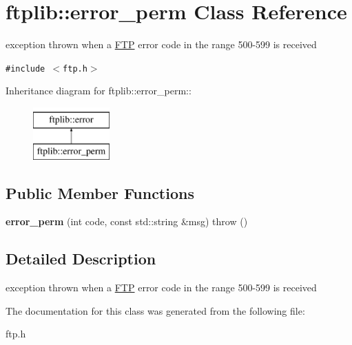 \hypertarget{classftplib_1_1error__perm}{
\section{ftplib::error\_\-perm Class Reference}
\label{classftplib_1_1error__perm}
}
exception thrown when a \hyperlink{classftplib_1_1FTP}{FTP} error code in the range 500-599 is received  


{\tt \#include $<$ftp.h$>$}

Inheritance diagram for ftplib::error\_\-perm::\begin{figure}[H]
\begin{center}
\leavevmode
\includegraphics[height=2cm]{classftplib_1_1error__perm}
\end{center}
\end{figure}
\subsection*{Public Member Functions}
\begin{CompactItemize}
\item 
\hypertarget{classftplib_1_1error__perm_f39cb3638a78e6967e56d1f7e7346bfb}{
\textbf{error\_\-perm} (int code, const std::string \&msg)  throw ()}
\label{classftplib_1_1error__perm_f39cb3638a78e6967e56d1f7e7346bfb}

\end{CompactItemize}


\subsection{Detailed Description}
exception thrown when a \hyperlink{classftplib_1_1FTP}{FTP} error code in the range 500-599 is received 

The documentation for this class was generated from the following file:\begin{CompactItemize}
\item 
ftp.h\end{CompactItemize}
